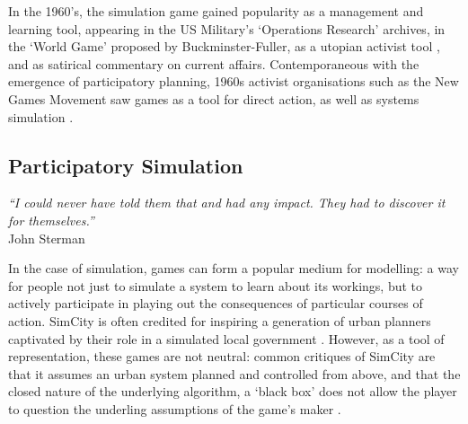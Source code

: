 \documentclass[nofonts,nols,justified,nobib]{tufte-book}
\begin{document}
In the 1960's, the simulation game gained popularity as a management and learning tool, appearing in the US Military's `Operations Research' archives\cite{landa_war_1991}, in the `World Game' proposed by Buckminster-Fuller\cite{buckminster_fuller_institute_about_nodate}, as a utopian activist tool \cite{johnson_inside_2013}, and as satirical commentary on current affairs\cite{dunnigan_few_1969}.
Contemporaneous with the emergence of participatory planning, 1960s activist organisations such as the New Games Movement saw games as a tool for direct action, as well as systems simulation \cite{johnson_inside_2013}. 

\subsection*{Participatory Simulation}

\begin{flushright}
\emph{``I could never have told them that and had any impact. They had to discover it for themselves.''}\cite{sterman_john_2013}\\
John Sterman
\end{flushright}

In the case of simulation, games can form a popular medium for modelling: a way for people not just to simulate a system to learn about its workings, but to actively participate in playing out the consequences of particular courses of action. SimCity is often credited for inspiring a generation of urban planners captivated by their role in a simulated local government \cite{roy_video_2019}. However, as a tool of representation, these games are not neutral: common critiques of SimCity are that it assumes an urban system planned and controlled from above, and that the closed nature of the underlying algorithm, a `black box' does not allow the player to question the underling assumptions of the game's maker \cite{starr_seductions_1994}.
\end{document}
